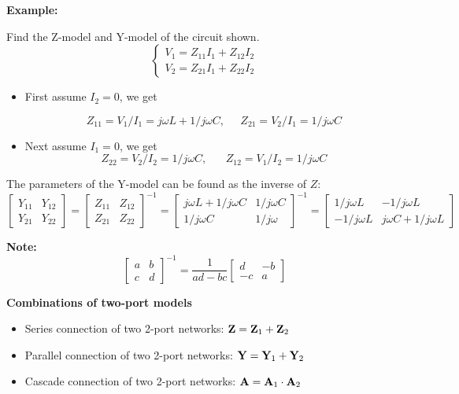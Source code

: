 \begin{itemize}
{\bf Example: } 


Find the Z-model and Y-model of the circuit shown.
\[ \left\{ \begin{array}{l} V_1=Z_{11}I_1+Z_{12}I_2 \\
	V_2=Z_{21}I_1+Z_{22}I_2 \end{array} \right.
\]
\begin{itemize}
\item First assume $I_2=0$, we get

\[ Z_{11}=V_1/I_1=j\omega L+1/j\omega C,\;\;\;\;\;Z_{21}=V_2/I_1=1/j\omega C \]
\item Next assume $I_1=0$, we get
\[ Z_{22}=V_2/I_2=1/j\omega C,\;\;\;\;\;\;Z_{12}=V_1/I_2=1/j\omega C \]
\end{itemize}
The parameters of the Y-model can be found as the inverse of $Z$:
\[ \left[\begin{array}{cc}Y_{11}&Y_{12}\\Y_{21}&Y_{22}\end{array}\right]
  =\left[\begin{array}{cc}Z_{11}&Z_{12}\\Z_{21}&Z_{22}\end{array}\right]^{-1}
  =\left[\begin{array}{cc}j\omega L+1/j\omega C & 1/j\omega C\\
	1/j\omega C & 1/j\omega \end{array}\right]^{-1}
  =\left[\begin{array}{cc}1/j\omega L & -1/j\omega L\\
	-1/j\omega L & j\omega C+1/j\omega L\end{array}\right] \]
	
{\bf Note:} 
\[	 \left[ \begin{array}{rr} a & b \\ c & d \end{array} \right]^{-1}
=\frac{1}{ad-bc}\left[ \begin{array}{rr} d & -b \\ -c & a \end{array} \right]
\]

{\bf Combinations of two-port models}

\begin{itemize}
\item Series connection of two 2-port networks: 
	${\bf Z}={\bf Z}_1+{\bf Z}_2$
\item Parallel connection of two 2-port networks: 
	${\bf Y}={\bf Y}_1+{\bf Y}_2$
\item Cascade connection of two 2-port networks:
	${\bf A}={\bf A}_1 \cdot {\bf A}_2$
\end{itemize}


\end{itemize}

